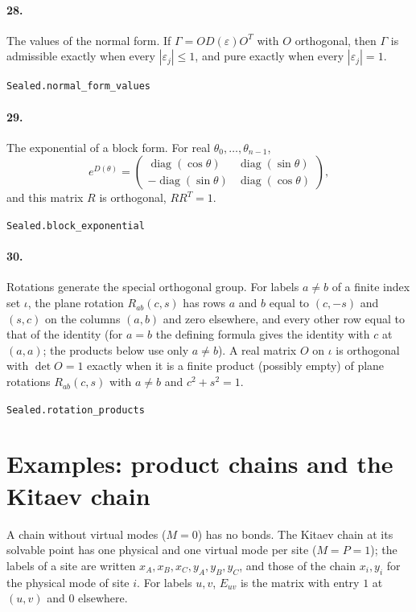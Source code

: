 \documentclass[11pt]{article}
\begin{document}
\paragraph{28.} The values of the normal form. If $\Gamma = O D(\varepsilon) O^T$ with $O$ orthogonal, then $\Gamma$ is admissible exactly when every $|\varepsilon_j| \le 1$, and pure exactly when every $|\varepsilon_j| = 1$.\par{\footnotesize\texttt{Sealed.normal\_form\_values}}

\paragraph{29.} The exponential of a block form. For real $\theta_0, \dots, \theta_{n-1}$, \[e^{D(\theta)} = \begin{pmatrix} \operatorname{diag}(\cos\theta) & \operatorname{diag}(\sin\theta) \\ -\operatorname{diag}(\sin\theta) & \operatorname{diag}(\cos\theta) \end{pmatrix},\] and this matrix $R$ is orthogonal, $R R^T = 1$.\par{\footnotesize\texttt{Sealed.block\_exponential}}

\paragraph{30.} Rotations generate the special orthogonal group. For labels $a \ne b$ of a finite index set $\iota$, the plane rotation $R_{ab}(c, s)$ has rows $a$ and $b$ equal to $(c, -s)$ and $(s, c)$ on the columns $(a, b)$ and zero elsewhere, and every other row equal to that of the identity (for $a = b$ the defining formula gives the identity with $c$ at $(a, a)$; the products below use only $a \ne b$). A real matrix $O$ on $\iota$ is orthogonal with $\det O = 1$ exactly when it is a finite product (possibly empty) of plane rotations $R_{ab}(c, s)$ with $a \ne b$ and $c^2 + s^2 = 1$.\par{\footnotesize\texttt{Sealed.rotation\_products}}

\section*{Examples: product chains and the Kitaev chain}
A chain without virtual modes ($M = 0$) has no bonds. The Kitaev chain at its solvable point has one physical and one virtual mode per site ($M = P = 1$); the labels of a site are written $x_A, x_B, x_C, y_A, y_B, y_C$, and those of the chain $x_i, y_i$ for the physical mode of site $i$. For labels $u, v$, $E_{uv}$ is the matrix with entry $1$ at $(u, v)$ and $0$ elsewhere.
\end{document}
